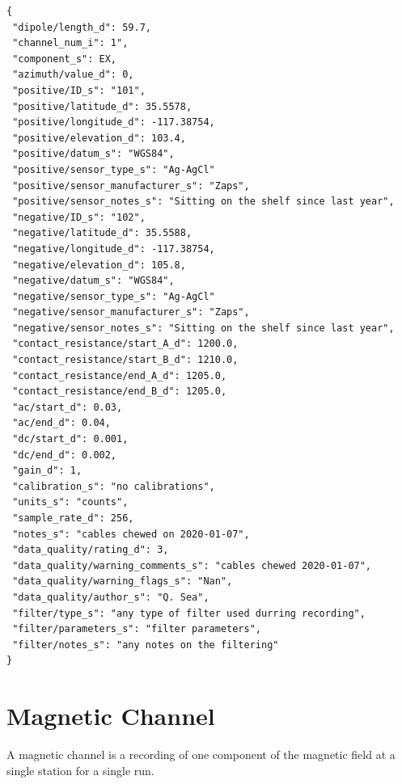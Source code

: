 \documentclass{article}
\begin{document}
\begin{verbatim}
{
 "dipole/length_d": 59.7,
 "channel_num_i": 1",
 "component_s": EX,
 "azimuth/value_d": 0,
 "positive/ID_s": "101",
 "positive/latitude_d": 35.5578,
 "positive/longitude_d": -117.38754,
 "positive/elevation_d": 103.4,
 "positive/datum_s": "WGS84",
 "positive/sensor_type_s": "Ag-AgCl"
 "positive/sensor_manufacturer_s": "Zaps",
 "positive/sensor_notes_s": "Sitting on the shelf since last year",
 "negative/ID_s": "102",
 "negative/latitude_d": 35.5588,
 "negative/longitude_d": -117.38754,
 "negative/elevation_d": 105.8,
 "negative/datum_s": "WGS84",
 "negative/sensor_type_s": "Ag-AgCl"
 "negative/sensor_manufacturer_s": "Zaps",
 "negative/sensor_notes_s": "Sitting on the shelf since last year",
 "contact_resistance/start_A_d": 1200.0,
 "contact_resistance/start_B_d": 1210.0,
 "contact_resistance/end_A_d": 1205.0,
 "contact_resistance/end_B_d": 1205.0,
 "ac/start_d": 0.03,
 "ac/end_d": 0.04,
 "dc/start_d": 0.001,
 "dc/end_d": 0.002,
 "gain_d": 1,
 "calibration_s": "no calibrations",
 "units_s": "counts",
 "sample_rate_d": 256,
 "notes_s": "cables chewed on 2020-01-07",
 "data_quality/rating_d": 3,
 "data_quality/warning_comments_s": "cables chewed 2020-01-07",
 "data_quality/warning_flags_s": "Nan",
 "data_quality/author_s": "Q. Sea",
 "filter/type_s": "any type of filter used durring recording",
 "filter/parameters_s": "filter parameters",
 "filter/notes_s": "any notes on the filtering"
}
\end{verbatim}

\newpage
\section{Magnetic Channel}

A magnetic channel is a recording of one component of the magnetic field at a single station for a single run.
\end{document}
